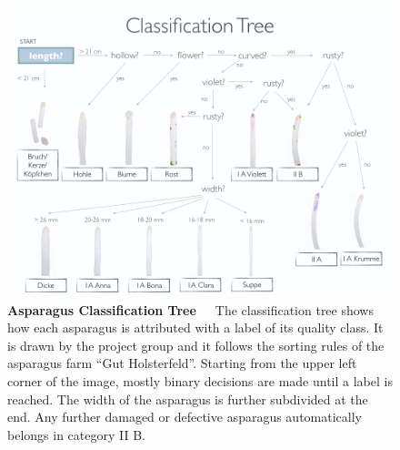 \begin{figure}[h]
	\centering
	\includegraphics[scale=0.39]{Figures/chapter01/fig_tree_with_title}
	\decoRule
	\caption[Asparagus Classification Tree]{\textbf{Asparagus Classification Tree}~~~The classification tree shows how each asparagus is attributed with a label of its quality class. It is drawn by the project group and it follows the sorting rules of the asparagus farm “Gut Holsterfeld”. Starting from the upper left corner of the image, mostly binary decisions are made until a label is reached. The width of the asparagus is further subdivided at the end. Any further damaged or defective asparagus automatically belongs in category II B.}
	\label{fig:LabelTree}
\end{figure}

